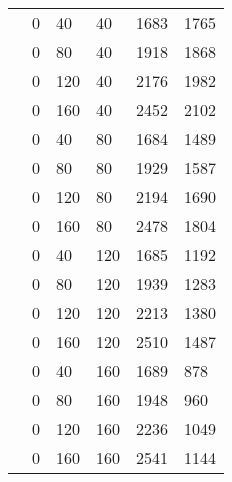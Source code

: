 \begin{longtable}{| C{0.10\textwidth} | *{3}{C{0.08\textwidth}} | *{2}{C{0.10\textwidth}} |}
    \hline
    & 0 & 40 & 40 & 1683 & 1765 \\
    & 0 & 80 & 40 & 1918 & 1868 \\
    & 0 & 120 & 40 & 2176 & 1982 \\
    & 0 & 160 & 40 & 2452 & 2102 \\
    & 0 & 40 & 80 & 1684 & 1489 \\
    & 0 & 80 & 80 & 1929 & 1587 \\
    & 0 & 120 & 80 & 2194 & 1690 \\
    & 0 & 160 & 80 & 2478 & 1804 \\
    & 0 & 40 & 120 & 1685 & 1192 \\
    & 0 & 80 & 120 & 1939 & 1283 \\
    & 0 & 120 & 120 & 2213 & 1380 \\
    & 0 & 160 & 120 & 2510 & 1487 \\
    & 0 & 40 & 160 & 1689 & 878 \\
    & 0 & 80 & 160 & 1948 & 960 \\
    & 0 & 120 & 160 & 2236 & 1049 \\
    & 0 & 160 & 160 & 2541 & 1144 \\  
    \hline
\end{longtable}
